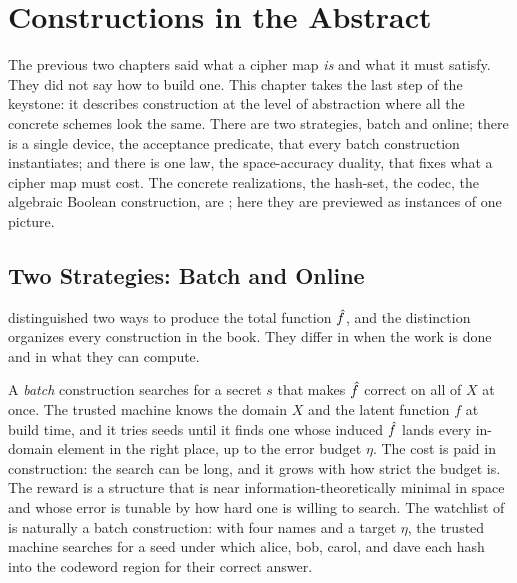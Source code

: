 
\chapter{Constructions in the Abstract}
\label{ch:constructions-abstract}

The previous two chapters said what a cipher map \emph{is} and what it must
satisfy. They did not say how to build one. This chapter takes the last step
of the keystone: it describes construction at the level of abstraction where
all the concrete schemes look the same. There are two strategies, batch and
online; there is a single device, the acceptance predicate, that every batch
construction instantiates; and there is one law, the space-accuracy duality,
that fixes what a cipher map must cost. The concrete realizations, the
hash-set, the codec, the algebraic Boolean construction, are
; here they are previewed as instances of one
picture.

\section{Two Strategies: Batch and Online}
\label{sec:strategies}

 distinguished two ways to produce the total
function $\hat{f}$, and the distinction organizes every construction in the
book. They differ in when the work is done and in what they can compute.

A \emph{batch} construction searches for a secret $s$ that makes $\hat{f}$
correct on all of $X$ at once. The trusted machine knows the domain $X$ and
the latent function $f$ at build time, and it tries seeds until it finds one
whose induced $\hat{f}$ lands every in-domain element in the right place, up to
the error budget $\eta$. The cost is paid in construction: the search can be
long, and it grows with how strict the budget is. The reward is a structure
that is near information-theoretically minimal in space and whose error is
tunable by how hard one is willing to search. The watchlist of
 is naturally a batch construction: with four
names and a target $\eta$, the trusted machine searches for a seed under
which alice, bob, carol, and dave each hash into the codeword region for
their correct answer.

